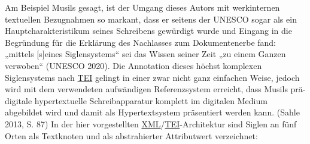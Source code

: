 \documentclass{article}
\begin{document}
        Am Beispiel Musils gesagt, ist der Umgang dieses Autors mit werkinternen
                  textuellen Bezugnahmen so markant, dass er seitens der UNESCO sogar als ein
                  Hauptcharakteristikum seines Schreibens gewürdigt wurde und Eingang in die
                  Begründung für die Erklärung des Nachlasses zum Dokumentenerbe fand: „mittels
                  [s]eines Siglensystems“ sei das Wissen seiner Zeit „zu einem Ganzen verwoben“
                     (UNESCO 2020). Die Annotation dieses höchst komplexen
                  Siglensystems nach \href{http://gams.uni-graz.at/o:konde.178}{TEI} gelingt in
                  einer zwar nicht ganz einfachen Weise, jedoch wird mit dem verwendeten aufwändigen
                  Referenzsystem erreicht, dass Musils prä-digitale hypertextuelle Schreibapparatur
                  komplett im digitalen Medium abgebildet wird und damit als Hypertextsystem
                  präsentiert werden kann. (Sahle 2013, S. 87) In der hier
                  vorgestellten \href{http://gams.uni-graz.at/o:konde.215}{XML}/\href{http://gams.uni-graz.at/o:konde.178}{TEI}-Architektur sind Siglen an fünf
                  Orten als Textknoten und als abstrahierter Attributwert verzeichnet: \\
            
\end{document}
